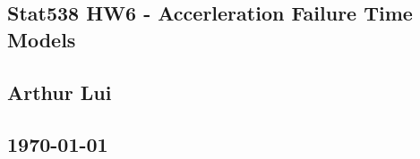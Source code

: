 \documentclass{article}                                                   %
\begin{document}
\begin{center}                                                            %
  \section*{\textbf{Stat538 HW6 - Accerleration Failure Time Models}}     %
  \subsection*{\textbf{Arthur Lui}}                                       %
  \subsection*{\noindent\today}                                           %
\end{center}                                                              %
\end{document}
